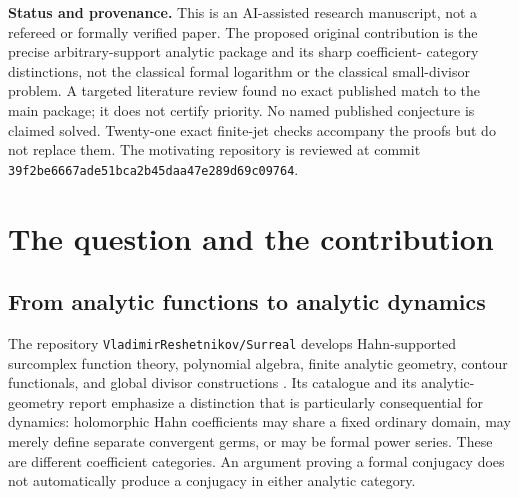 \documentclass[11pt,letterpaper]{article}
\theoremstyle{definition}
\theoremstyle{remark}
\numberwithin{equation}{section}
\begin{document}
\begin{titlepage}
\begin{minipage}{0.92\textwidth}
\begin{abstract}
We also construct exact logarithms, fractional iterates, and flows of every
positive perturbation of the identity on the same coefficient domain. All
nonzero integer iterates have the same fixed-point ideal; in one variable the
full positive centralizer is an explicit group of Hahn times. A finite-order
multiplier admits a same-domain rotation--flow normal form. An explicit
non-Brjuno rotation satisfying $\tau=0$ separates the Hahn theory from ordinary
analytic linearization, and a critical-scale example explains why this is not
an all-scale theorem.
\end{abstract}
\end{minipage}
\vfill
\begin{minipage}{0.92\textwidth}\small
\textbf{Status and provenance.} This is an AI-assisted research manuscript,
not a refereed or formally verified paper. The proposed original contribution
is the precise arbitrary-support analytic package and its sharp coefficient-
category distinctions, not the classical formal logarithm or the classical
small-divisor problem. A targeted literature review found no exact published
match to the main package; it does not certify priority. No named published
conjecture is claimed solved. Twenty-one exact finite-jet checks accompany the
proofs but do not replace them. The motivating repository is reviewed at
commit \texttt{39f2be6667ade51bca2b45daa47e289d69c09764}.
\end{minipage}
\end{titlepage}
\hypersetup{pageanchor=true}
\tableofcontents
\clearpage
{}

\section{The question and the contribution}\label{sec:intro}

\subsection{From analytic functions to analytic dynamics}
The repository \texttt{VladimirReshetnikov/Surreal} develops Hahn-supported
surcomplex function theory, polynomial algebra, finite analytic geometry,
contour functionals, and global divisor constructions \cite{Repo}. Its
catalogue and its analytic-geometry report emphasize a distinction that is
particularly consequential for dynamics: holomorphic Hahn coefficients may
share a fixed ordinary domain, may merely define separate convergent germs,
or may be formal power series. These are different coefficient categories.
An argument proving a formal conjugacy does not automatically produce a
conjugacy in either analytic category.
\end{document}
